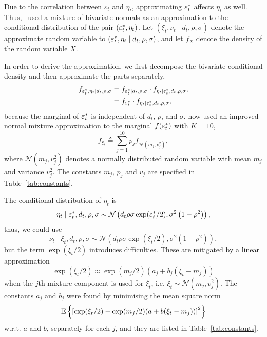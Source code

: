 Due to the correlation between $\varepsilon_t$ and $\eta_t$, approximating $\varepsilon_t^\ast$ affects $\eta_t$ as well.
Thus,~\citeauthor{Omori2007} used a mixture of bivariate normals as an approximation to the conditional distribution of the pair $(\varepsilon_t^\ast, \eta_t)$.
Let $(\xi_t,\nu_t\mid d_t,\rho,\sigma)$ denote the approximate random variable to $(\varepsilon_t^\ast,\eta_t\mid d_t,\rho,\sigma)$, and let $f_X$ denote the density of the random variable $X$.

In order to derive the approximation, we first decompose the bivariate conditional density and then approximate the parts separately,
\begin{align}
f_{\varepsilon_t^\ast,\eta_t\mid d_t,\rho,\sigma} &= f_{\varepsilon_t^\ast\mid d_t,\rho,\sigma}\cdot f_{\eta_t\mid\varepsilon_t^\ast,d_t,\rho,\sigma},\nonumber \\
&= f_{\varepsilon_t^\ast}\cdot f_{\eta_t\mid\varepsilon_t^\ast,d_t,\rho,\sigma}\label{eq:decomp},
\end{align}
because the marginal of $\varepsilon_t^\ast$ is independent of $d_t$, $\rho$, and $\sigma$.
\citeauthor{Omori2007} now used an improved normal mixture approximation to the marginal $f(\varepsilon_t^\ast)$ with $K=10$,
\begin{equation}\label{eq:ets}
f_{\xi_t}\triangleq\sum_{j=1}^{10}p_jf_{\mathcal{N}\left(m_j,v_j^2\right)},
\end{equation}
where $\mathcal{N}\left(m_j,v_j^2\right)$ denotes a normally distributed random variable with mean $m_j$ and variance $v_j^2$.
The constants $m_j$, $p_j$ and $v_j$ are specified in Table~\ref{tab:constants}.

The conditional distribution of $\eta_t$ is
\begin{equation*}
\eta_t\mid\varepsilon_t^\ast,d_t,\rho,\sigma\sim\mathcal{N}\left(d_t\rho\sigma\exp(\varepsilon_t^\ast/2),\sigma^2\left(1-\rho^2\right)\right),
\end{equation*}
thus, we could use
\begin{equation}\label{eq:eta}
\nu_t\mid\xi_t,d_t,\rho,\sigma\sim\mathcal{N}\left(d_t\rho\sigma\exp(\xi_t/2),\sigma^2\left(1-\rho^2\right)\right),
\end{equation}
but the term $\exp(\xi_t/2)$ introduces difficulties.
These are mitigated by a linear approximation
\begin{equation}\label{eq:etslinear}
\exp(\xi_t/2)\approx\exp(m_j/2)(a_j+b_j(\xi_t-m_j))
\end{equation}
when the $j$th mixture component is used for $\xi_t$, i.e. $\xi_t\sim\mathcal{N}(m_j,v_j^2)$.
The constants $a_j$ and $b_j$ were found by minimising the mean square norm 
\begin{equation*}
\mathbb{E}\left\{\left[\exp(\xi_t/2)-\exp(m_j/2)(a+b(\xi_t-m_j))\right]^2\right\}
\end{equation*}
w.r.t. $a$ and $b$, separately for each $j$, and they are listed in Table~\ref{tab:constants}.

